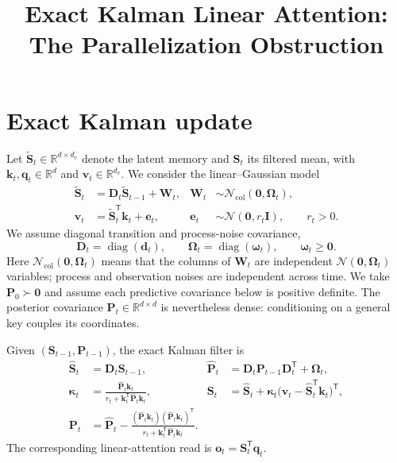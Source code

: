 \documentclass[11pt]{article}
\title{Exact Kalman Linear Attention:\\The Parallelization Obstruction}
\author{}
\date{}
\newcommand{\vct}[1]{\boldsymbol{#1}}
\newcommand{\tr}{\mathsf{T}}
\newcommand{\R}{\mathbb{R}}
\DeclareMathOperator{\diag}{diag}
\begin{document}
\maketitle

\section{Exact Kalman update}

Let $\widetilde{\vct{S}}_t\in\R^{d\times d_v}$ denote the latent memory and
$\vct{S}_t$ its filtered mean, with $\vct{k}_t,\vct{q}_t\in\R^d$ and
$\vct{v}_t\in\R^{d_v}$.  We consider the linear--Gaussian model
\begin{align}
  \widetilde{\vct{S}}_t
  &=\vct{D}_t\widetilde{\vct{S}}_{t-1}+\vct{W}_t,
  &
  \vct{W}_t&\sim\mathcal N_{\mathrm{col}}(\vct{0},\vct{\Omega}_t),
  \\
  \vct{v}_t
  &=\widetilde{\vct{S}}_t^{\tr}\vct{k}_t+\vct{e}_t,
  &
  \vct{e}_t&\sim\mathcal N(\vct{0},r_t\vct{I}),
  \qquad r_t>0.
\end{align}
We assume diagonal transition and process-noise covariance,
\begin{equation}
  \vct{D}_t=\diag(\vct{d}_t),
  \qquad
  \vct{\Omega}_t=\diag(\vct{\omega}_t),
  \qquad \vct{\omega}_t\geq\vct{0}.
\end{equation}
Here $\mathcal N_{\mathrm{col}}(\vct{0},\vct{\Omega}_t)$ means that the
columns of $\vct{W}_t$ are independent $\mathcal N(\vct{0},\vct{\Omega}_t)$
variables; process and observation noises are independent across time.  We
take $\vct{P}_0\succ\vct{0}$ and assume each predictive covariance below is
positive definite.
The posterior covariance $\vct{P}_t\in\R^{d\times d}$ is nevertheless dense:
conditioning on a general key couples its coordinates.

Given $(\vct{S}_{t-1},\vct{P}_{t-1})$, the exact Kalman filter is
\begin{align}
  \widehat{\vct{S}}_t
  &=\vct{D}_t\vct{S}_{t-1},
  &
  \widehat{\vct{P}}_t
  &=\vct{D}_t\vct{P}_{t-1}\vct{D}_t^{\tr}+\vct{\Omega}_t,
  \\
  \vct{\kappa}_t
  &=\frac{\widehat{\vct{P}}_t\vct{k}_t}
  {r_t+\vct{k}_t^{\tr}\widehat{\vct{P}}_t\vct{k}_t},
  &
  \vct{S}_t
  &=\widehat{\vct{S}}_t+
  \vct{\kappa}_t
  \bigl(\vct{v}_t-\widehat{\vct{S}}_t^{\tr}\vct{k}_t\bigr)^{\tr},
  \\
  \vct{P}_t
  &=\widehat{\vct{P}}_t-
  \frac{(\widehat{\vct{P}}_t\vct{k}_t)
  (\widehat{\vct{P}}_t\vct{k}_t)^{\tr}}
  {r_t+\vct{k}_t^{\tr}\widehat{\vct{P}}_t\vct{k}_t}.
\end{align}
The corresponding linear-attention read is
$\vct{o}_t=\vct{S}_t^{\tr}\vct{q}_t$.
\end{document}

